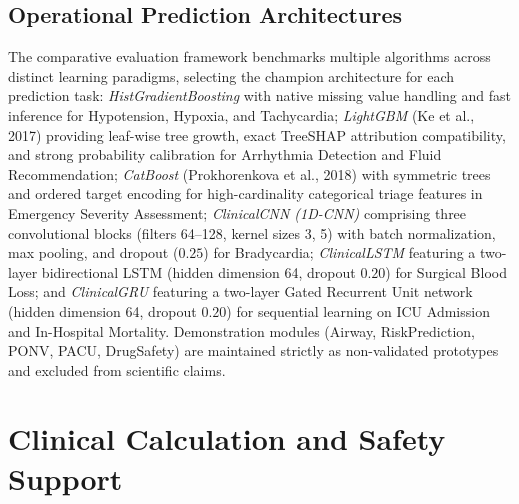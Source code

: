 \documentclass[conference]{IEEEtran}
\begin{document}
\subsection{Operational Prediction Architectures}
The comparative evaluation framework benchmarks multiple algorithms across distinct learning paradigms, selecting the champion architecture for each prediction task: \textit{HistGradientBoosting} with native missing value handling and fast inference for Hypotension, Hypoxia, and Tachycardia; \textit{LightGBM} (Ke et al., 2017) providing leaf-wise tree growth, exact TreeSHAP attribution compatibility, and strong probability calibration for Arrhythmia Detection and Fluid Recommendation; \textit{CatBoost} (Prokhorenkova et al., 2018) with symmetric trees and ordered target encoding for high-cardinality categorical triage features in Emergency Severity Assessment; \textit{ClinicalCNN (1D-CNN)} comprising three convolutional blocks (filters 64--128, kernel sizes 3, 5) with batch normalization, max pooling, and dropout ($0.25$) for Bradycardia; \textit{ClinicalLSTM} featuring a two-layer bidirectional LSTM (hidden dimension 64, dropout $0.20$) for Surgical Blood Loss; and \textit{ClinicalGRU} featuring a two-layer Gated Recurrent Unit network (hidden dimension 64, dropout $0.20$) for sequential learning on ICU Admission and In-Hospital Mortality. Demonstration modules (Airway, RiskPrediction, PONV, PACU, DrugSafety) are maintained strictly as non-validated prototypes and excluded from scientific claims.

\section{Clinical Calculation and Safety Support}
\end{document}
